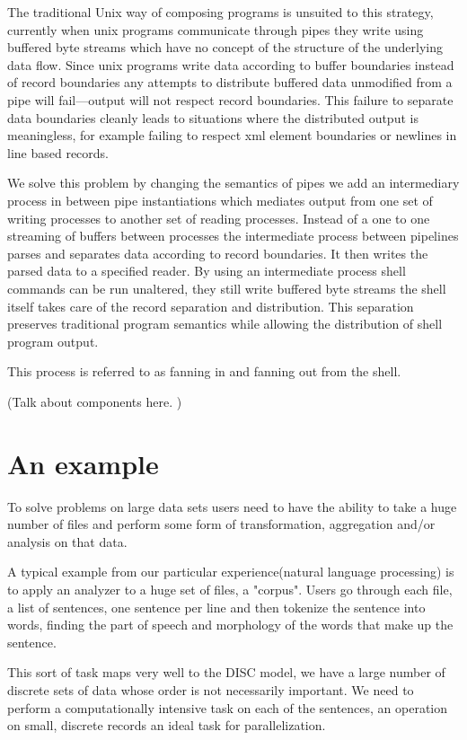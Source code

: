 \documentclass[11pt, letterpaper]{article}
\begin{document}
The traditional Unix way of composing programs is unsuited to this strategy, currently when unix programs communicate through pipes they write using buffered byte streams which have no concept of the structure of the underlying data flow. Since unix programs write data according to buffer boundaries instead of record boundaries any attempts to distribute buffered data unmodified from a pipe will fail---output will not respect record boundaries. This failure to separate data boundaries cleanly leads to situations where the distributed output is meaningless, for example failing to respect xml element boundaries or newlines in line based records. 
   


We solve this problem by changing the semantics of pipes  we add an intermediary process in between pipe instantiations which mediates output from one set of writing processes to another set of reading processes.    Instead of a one to one streaming of buffers between processes the intermediate process between pipelines parses and separates data according to record boundaries. It then writes the parsed data to a specified reader. By using an intermediate process shell commands can be run unaltered, they still write buffered byte streams the shell itself takes care of the record separation and distribution. This separation preserves traditional program semantics while allowing the distribution of shell program output.

This process is referred to as fanning in and fanning out from the shell. 

(Talk about components here. )  
\section{An example}

To solve problems on large data sets users need to have the ability to take a huge number of files and  perform some form of transformation, aggregation and/or analysis on that data.  

A typical example from our particular experience(natural language processing) is to apply an analyzer to a huge set of files, a "corpus". Users go through each file, a list of sentences, one sentence per line and then tokenize the sentence into words, finding the part of speech and morphology of the words that make up the sentence.

This sort of task maps very well to the DISC model, we have a large number of discrete sets of data whose order is not necessarily important. We need to perform a computationally intensive task on each of the sentences, an operation on small, discrete records an ideal task for parallelization. 
\end{document}
